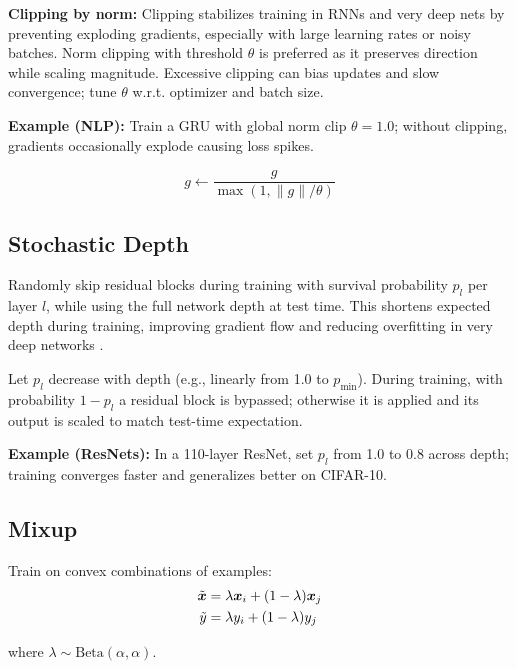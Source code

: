 \textbf{Clipping by norm:}
Clipping stabilizes training in RNNs and very deep nets by preventing exploding gradients, especially with large learning rates or noisy batches. Norm clipping with threshold $\theta$ is preferred as it preserves direction while scaling magnitude. Excessive clipping can bias updates and slow convergence; tune $\theta$ w.r.t. optimizer and batch size.

\begin{example}
\textbf{Example (NLP):} Train a GRU with global norm clip $\theta=1.0$; without clipping, gradients occasionally explode causing loss spikes.
\end{example}
\begin{equation}
g \leftarrow \frac{g}{\max(1, \|g\| / \theta)}
\end{equation}

\subsection{Stochastic Depth}

Randomly skip residual blocks during training with survival probability $p_l$ per layer $l$, while using the full network depth at test time. This shortens expected depth during training, improving gradient flow and reducing overfitting in very deep networks \cite{Huang2016StochasticDepth}.

Let $p_l$ decrease with depth (e.g., linearly from 1.0 to $p_{\min}$). During training, with probability $1-p_l$ a residual block is bypassed; otherwise it is applied and its output is scaled to match test-time expectation.

\begin{example}
\textbf{Example (ResNets):} In a 110-layer ResNet, set $p_l$ from 1.0 to 0.8 across depth; training converges faster and generalizes better on CIFAR-10.
\end{example}

\subsection{Mixup}

Train on convex combinations of examples:
\begin{align}
\tilde{\boldsymbol{x}} &= \lambda \boldsymbol{x}_i + (1-\lambda) \boldsymbol{x}_j \\
\tilde{y} &= \lambda y_i + (1-\lambda) y_j
\end{align}

where $\lambda \sim \text{Beta}(\alpha, \alpha)$.

